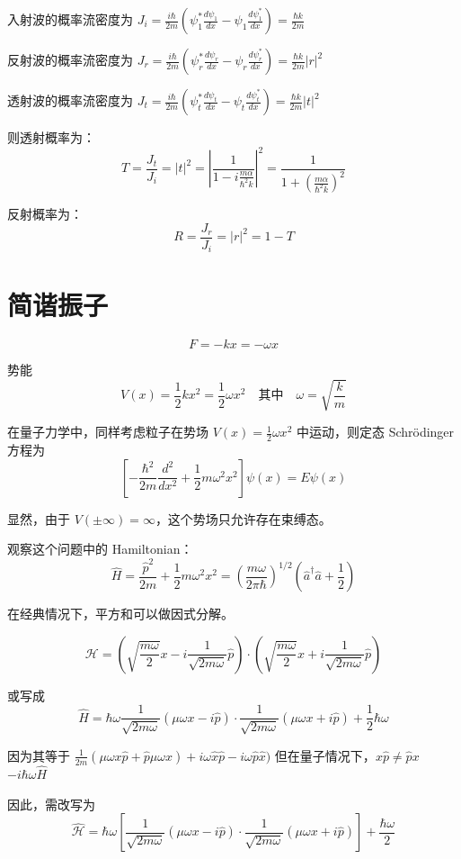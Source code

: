 \documentclass[lang=cn,10pt]{elegantbook}
\begin{document}
入射波的概率流密度为 $J_i = \frac{i\hbar}{2m} (\psi_1^* \frac{d\psi_1}{dx} - \psi_1 \frac{d\psi_1^*}{dx}) = \frac{\hbar k}{2m}$

反射波的概率流密度为 $J_r = \frac{i\hbar}{2m} (\psi_r^* \frac{d\psi_r}{dx} - \psi_r \frac{d\psi_r^*}{dx}) = \frac{\hbar k}{2m} |r|^2$

透射波的概率流密度为 $J_t = \frac{i\hbar}{2m} (\psi_t^* \frac{d\psi_t}{dx} - \psi_t \frac{d\psi_t^*}{dx}) = \frac{\hbar k}{2m} |t|^2$

则透射概率为：
\[
T = \frac{J_t}{J_i} = |t|^2 = \left| \frac{1}{1 - i\frac{m\alpha}{\hbar^2 k}} \right|^2 = \frac{1}{1 + \left(\frac{m\alpha}{\hbar^2 k}\right)^2}
\]

反射概率为：
\[
R = \frac{J_r}{J_i} = |r|^2 = 1 - T
\]
\section{简谐振子}
\[
F = -kx = -\omega x
\]

势能
\[
V(x) = \frac{1}{2}kx^2 = \frac{1}{2}\omega x^2 \quad \text{其中} \quad \omega = \sqrt{\frac{k}{m}}
\]

在量子力学中，同样考虑粒子在势场 \( V(x) = \frac{1}{2}\omega x^2 \) 中运动，则定态 Schrödinger 方程为
\[
\left[ -\frac{\hbar^2}{2m} \frac{d^2}{dx^2} + \frac{1}{2}m\omega^2 x^2 \right] \psi(x) = E \psi(x)
\]

显然，由于 \( V(\pm\infty) = \infty \)，这个势场只允许存在束缚态。

观察这个问题中的 Hamiltonian：
\[
\hat{H} = \frac{\hat{p}^2}{2m} + \frac{1}{2}m\omega^2 x^2 = \left( \frac{m\omega}{2\pi\hbar} \right)^{1/2} \left( \hat{a}^\dagger \hat{a} + \frac{1}{2} \right)
\]

在经典情况下，平方和可以做因式分解。

\[
\mathcal{H} = \left( \sqrt{\frac{m\omega}{2}} x - i \frac{1}{\sqrt{2m\omega}} \hat{p} \right) \cdot \left( \sqrt{\frac{m\omega}{2}} x + i \frac{1}{\sqrt{2m\omega}} \hat{p} \right)
\]

或写成
\[
\hat{H} = \hbar \omega \frac{1}{\sqrt{2m\omega}} (\mu \omega x - i \hat{p}) \cdot \frac{1}{\sqrt{2m\omega}} (\mu \omega x + i \hat{p}) + \frac{1}{2} \hbar \omega
\]

因为其等于 \(\frac{1}{2m} (\mu \omega x \hat{p} + \hat{p} \mu \omega x) + i \omega \hat{x} \hat{p} - i \omega \hat{p} \hat{x})\) 但在量子情况下，\(x \hat{p} \neq \hat{p} x\) \(-i\hbar \omega \hat{H}\)

因此，需改写为
\[
\hat{\mathcal{H}} = \hbar \omega \left[ \frac{1}{\sqrt{2m\omega}} (\mu \omega x - i \hat{p}) \cdot \frac{1}{\sqrt{2m\omega}} (\mu \omega x + i \hat{p}) \right] + \frac{\hbar \omega}{2}
\]
\end{document}
